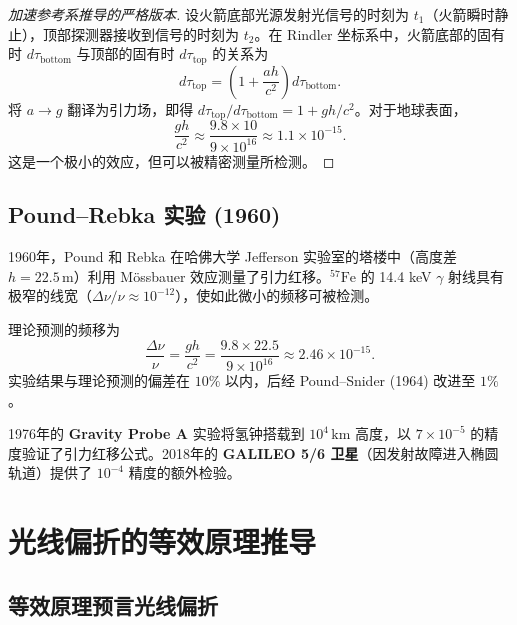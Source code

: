 \begin{proof}[加速参考系推导的严格版本]
设火箭底部光源发射光信号的时刻为 $t_1$（火箭瞬时静止），顶部探测器接收到信号的时刻为 $t_2$。在 Rindler 坐标系中，火箭底部的固有时 $d\tau_{\text{bottom}}$ 与顶部的固有时 $d\tau_{\text{top}}$ 的关系为
\begin{equation}
    d\tau_{\text{top}} = \left(1 + \frac{ah}{c^2}\right) d\tau_{\text{bottom}}.
\end{equation}
将 $a \to g$ 翻译为引力场，即得 $d\tau_{\text{top}}/d\tau_{\text{bottom}} = 1 + gh/c^2$。对于地球表面，
\begin{equation}
    \frac{gh}{c^2} \approx \frac{9.8 \times 10}{9 \times 10^{16}} \approx 1.1 \times 10^{-15}.
\end{equation}
这是一个极小的效应，但可以被精密测量所检测。
\end{proof}

\subsection{Pound--Rebka 实验 (1960)}

\begin{example}
1960年，Pound 和 Rebka 在哈佛大学 Jefferson 实验室的塔楼中（高度差 $h=22.5\,\text{m}$）利用 M\"{o}ssbauer 效应测量了引力红移。$^{57}\text{Fe}$ 的 14.4 keV $\gamma$ 射线具有极窄的线宽（$\Delta\nu/\nu \approx 10^{-12}$），使如此微小的频移可被检测。

理论预测的频移为
\begin{equation}
    \frac{\Delta\nu}{\nu} = \frac{gh}{c^2} = \frac{9.8 \times 22.5}{9 \times 10^{16}} \approx 2.46 \times 10^{-15}.
\end{equation}
实验结果与理论预测的偏差在 $10\%$ 以内，后经 Pound--Snider (1964) 改进至 $1\%$。

1976年的 \textbf{Gravity Probe A} 实验将氢钟搭载到 $10^4\,\text{km}$ 高度，以 $7\times 10^{-5}$ 的精度验证了引力红移公式。2018年的 \textbf{GALILEO 5/6 卫星}（因发射故障进入椭圆轨道）提供了 $10^{-4}$ 精度的额外检验。
\end{example}

\section{光线偏折的等效原理推导}

\subsection{等效原理预言光线偏折}

